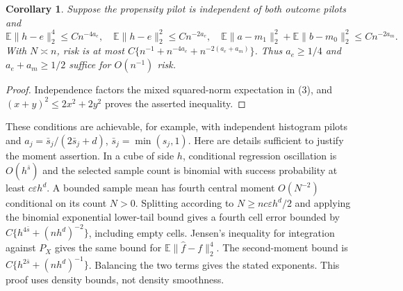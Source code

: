 \documentclass[11pt]{article}
\newtheorem{corollary}[theorem]{Corollary}
\theoremstyle{definition}
\begin{document}
\begin{corollary}
Suppose the propensity pilot is independent of both outcome pilots and
\[
 \mathbb E\|h-e\|_2^4\le C n^{-4a_e},\quad
 \mathbb E\|h-e\|_2^2\le C n^{-2a_e},\quad
 \mathbb E\|a-m_1\|_2^2+\mathbb E\|b-m_0\|_2^2\le C n^{-2a_m}.
\]
With $N\asymp n$, risk is at most
$C\{n^{-1}+n^{-4a_e}+n^{-2(a_e+a_m)}\}$.
Thus $a_e\ge1/4$ and $a_e+a_m\ge1/2$ suffice for $O(n^{-1})$ risk.
\end{corollary}
\begin{proof}
Independence factors the mixed squared-norm expectation in (3), and
$(x+y)^2\le2x^2+2y^2$ proves the asserted inequality.
\end{proof}
These conditions are achievable, for example, with independent histogram
pilots and $a_j=\bar s_j/(2\bar s_j+d)$, $\bar s_j=\min(s_j,1)$.
Here are details sufficient to justify the moment assertion. In a cube of
side $h$, conditional regression oscillation is $O(h^{\bar s})$ and the
selected sample count is binomial with success probability at least
$c\varepsilon h^d$. A bounded sample mean has fourth central moment
$O(N^{-2})$ conditional on its count $N>0$. Splitting according to
$N\ge n c\varepsilon h^d/2$ and applying the binomial exponential lower-tail
bound gives a fourth cell error bounded by
$C\{h^{4\bar s}+(nh^d)^{-2}\}$, including empty cells.
Jensen's inequality for integration against $P_X$ gives the same bound
for $\mathbb E\|\widehat f-f\|_2^4$. The second-moment bound is
$C\{h^{2\bar s}+(nh^d)^{-1}\}$. Balancing the two terms gives the stated
exponents. This proof uses density bounds, not density smoothness.
\end{document}
